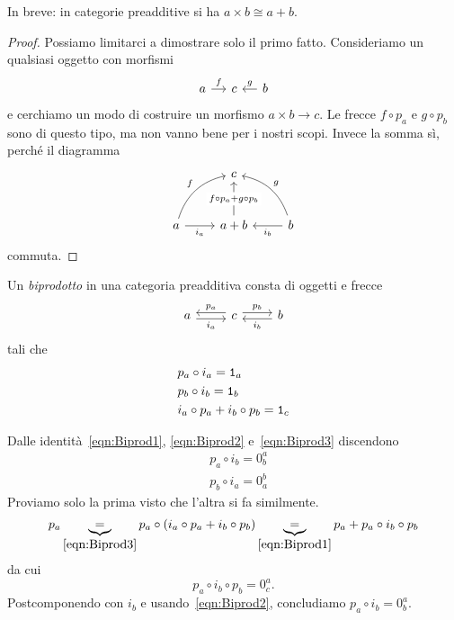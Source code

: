 In breve: in categorie preadditive si ha \(a \times b \cong a+b\).

\begin{proof}
  Possiamo limitarci a dimostrare solo il primo fatto. Consideriamo un
  qualsiasi oggetto con morfismi
 \[
    \begin{tikzcd}[column sep=small]
      a \ar["f", r] & c & b  \ar["g", l, swap]
    \end{tikzcd}
  \]
  e cerchiamo un modo di costruire un morfismo \(a \times b \to c\). Le
  frecce \(f \circ p_a\) e \(g \circ p_b\) sono di questo tipo, ma non vanno
  bene per i nostri scopi. Invece la somma sì, perché il diagramma
  \[
    \begin{tikzcd}[row sep=large]
      & c \\
      a \ar["{i_a}", r, swap] \ar["f", ur, bend left] & a + b \ar["{f \circ p_a + g \circ
        p_b}" description, u] & b
      \ar["{i_b}", l] \ar["g", ul, bend right, swap]
    \end{tikzcd}
  \]
  commuta.
\end{proof}

\begin{definition}\label{definizione:Biprodotto}
  Un {\em biprodotto} in una categoria preadditiva consta di oggetti e frecce
  \[
    \begin{tikzcd}
      a \ar["{i_a}", r, shift right, swap] & c \ar["{p_a}", l, shift
      right, swap] \ar["{p_b}", r, shift left] & b \ar["{i_b}", l,
      shift left]
    \end{tikzcd}
  \]
  tali che
  \begin{align}
    & p_a \circ i_a = \mathtt 1_a \label{eqn:Biprod1} \\
    & p_b \circ i_b = \mathtt 1_b \label{eqn:Biprod2}\\
    & i_a \circ p_a + i_b \circ p_b = \mathtt 1_c \label{eqn:Biprod3}
  \end{align}
\end{definition}

\begin{remark}
  Dalle identità~\ref{eqn:Biprod1}, \ref{eqn:Biprod2}
  e~\ref{eqn:Biprod3} discendono
  \begin{align}
    & p_a \circ i_b = 0_b^a \label{eqn:Biprod4} \\
    & p_b \circ i_a = 0_a^b \label{eqn:Biprod5}
  \end{align}
  Proviamo solo la prima visto che l'altra si fa similmente.
  \[
    p_a \underbrace{=}_{\eqref{eqn:Biprod3}} p_a \circ \left( i_a \circ p_a + i_b \circ p_b \right) \underbrace{=}_{\eqref{eqn:Biprod1}} p_a + p_a \circ i_b \circ p_b
  \]
  da cui
  \[
    p_a \circ i_b \circ p_b = 0_c^a .
  \]
  Postcomponendo con \(i_b\) e usando~\eqref{eqn:Biprod2}, concludiamo \(p_a \circ i_b = 0_b^a\).
\end{remark}

